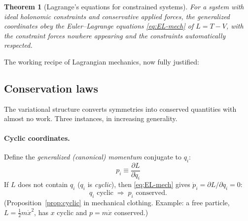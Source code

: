 \documentclass[11pt]{article}
\theoremstyle{plain}
\newtheorem{theorem}{Theorem}[section]
\theoremstyle{definition}
\theoremstyle{remark}
\newcommand{\pd}[2]{\frac{\partial #1}{\partial #2}}
\begin{document}
\begin{theorem}[Lagrange's equations for constrained systems]
\label{thm:constrained-L}
For a system with ideal holonomic constraints and conservative applied
forces, the generalized coordinates obey the Euler--Lagrange equations
\eqref{eq:EL-mech} of $L = T - V$, \emph{with the constraint forces
nowhere appearing and the constraints automatically respected}.
\end{theorem}

The working recipe of Lagrangian mechanics, now fully justified:
\begin{center}
\end{center}

\subsection{Conservation laws}
\label{sec:conservation}

The variational structure converts symmetries into conserved quantities
with almost no work. Three instances, in increasing generality.

\paragraph{Cyclic coordinates.}
Define the \emph{generalized (canonical) momentum} conjugate to $q_i$:
\begin{equation}
  \boxed{\;p_i \equiv \pd{L}{\dot q_i}\;}
\end{equation}
If $L$ does not contain $q_i$ ($q_i$ is \emph{cyclic}), then
\eqref{eq:EL-mech} gives $\dot p_i = \partial L/\partial q_i = 0$:
\begin{equation}
  \boxed{\;q_i \text{ cyclic} \;\Longrightarrow\; p_i \text{ conserved.}\;}
\end{equation}
(Proposition~\ref{prop:cyclic} in mechanical clothing. Example: a free
particle, $L = \tfrac12 m\dot x^2$, has $x$ cyclic and $p = m\dot x$
conserved.)
\end{document}
